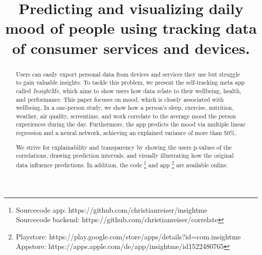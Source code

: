 \documentclass[conference]{IEEEtran}
\begin{document}
\title{Predicting and visualizing daily mood of people using tracking data of consumer services and devices.\\
}

\author{


\and


\and


}

\maketitle

\begin{abstract}
Users can easily export personal data from devices and services they use but struggle to gain valuable insights. To tackle this problem, we present the self-tracking meta app called \textit{InsightMe}, which aims to show users how data relate to their wellbeing, health, and performance. This paper focuses on mood, which is closely associated with wellbeing. In a one-person study, we show how a person's sleep, exercise, nutrition, weather, air quality, screentime, and work correlate to the average mood the person experiences during the day. Furthermore, the app predicts the mood via multiple linear regression and a neural network, achieving an explained variance of more than 50\%. 

We strive for explainability and transparency by showing the users p-values of the correlations, drawing prediction intervals, and visually illustrating how the original data influence predictions. In addition, the code
\footnote{Sourcecode app: https://github.com/christianreiser/insightme\\
Sourcecode backend: https://github.com/christianreiser/correlate}
and app
\footnote{Playstore: https://play.google.com/store/apps/details?id=com.insightme\\
Appstore: https://apps.apple.com/de/app/insightme/id1522480765}
are available online.
\end{abstract}
\end{document}
